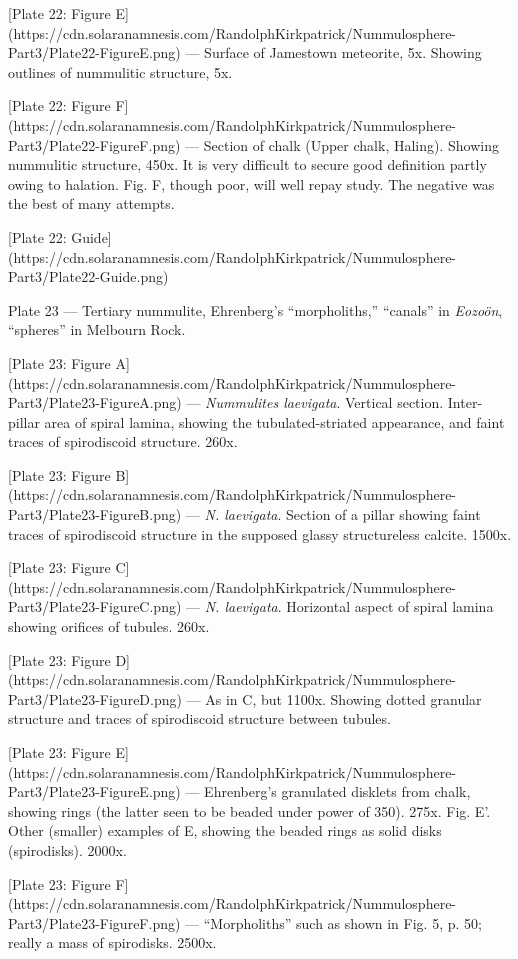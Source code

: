 \documentclass[a4paper, 12pt, oneside]{article}
\begin{document}
[Plate 22: Figure E](https://cdn.solaranamnesis.com/RandolphKirkpatrick/Nummulosphere-Part3/Plate22-FigureE.png) --- Surface of Jamestown meteorite, 5x. Showing outlines of nummulitic structure, 5x.

[Plate 22: Figure F](https://cdn.solaranamnesis.com/RandolphKirkpatrick/Nummulosphere-Part3/Plate22-FigureF.png) --- Section of chalk (Upper chalk, Haling). Showing nummulitic structure, 450x. It is very difficult to secure good definition partly owing to halation. Fig. F, though poor, will well repay study. The negative was the best of many attempts.

[Plate 22: Guide](https://cdn.solaranamnesis.com/RandolphKirkpatrick/Nummulosphere-Part3/Plate22-Guide.png)

Plate 23 --- Tertiary nummulite, Ehrenberg's ``morpholiths,'' ``canals'' in \emph{Eozoön}, ``spheres'' in Melbourn Rock.

[Plate 23: Figure A](https://cdn.solaranamnesis.com/RandolphKirkpatrick/Nummulosphere-Part3/Plate23-FigureA.png) --- \emph{Nummulites laevigata}. Vertical section. Inter-pillar area of spiral lamina, showing the tubulated-striated appearance, and faint traces of spirodiscoid structure. 260x.

[Plate 23: Figure B](https://cdn.solaranamnesis.com/RandolphKirkpatrick/Nummulosphere-Part3/Plate23-FigureB.png) --- \emph{N. laevigata}. Section of a pillar showing faint traces of spirodiscoid structure in the supposed glassy structureless calcite. 1500x.

[Plate 23: Figure C](https://cdn.solaranamnesis.com/RandolphKirkpatrick/Nummulosphere-Part3/Plate23-FigureC.png) --- \emph{N. laevigata}. Horizontal aspect of spiral lamina showing orifices of tubules. 260x.

[Plate 23: Figure D](https://cdn.solaranamnesis.com/RandolphKirkpatrick/Nummulosphere-Part3/Plate23-FigureD.png) --- As in C, but 1100x. Showing dotted granular structure and traces of spirodiscoid structure between tubules.

[Plate 23: Figure E](https://cdn.solaranamnesis.com/RandolphKirkpatrick/Nummulosphere-Part3/Plate23-FigureE.png) --- Ehrenberg's granulated disklets from chalk, showing rings (the latter seen to be beaded under power of 350). 275x. Fig. E'. Other (smaller) examples of E, showing the beaded rings as solid disks (spirodisks). 2000x.

[Plate 23: Figure F](https://cdn.solaranamnesis.com/RandolphKirkpatrick/Nummulosphere-Part3/Plate23-FigureF.png) --- ``Morpholiths'' such as shown in Fig. 5, p. 50; really a mass of spirodisks. 2500x.
\end{document}
